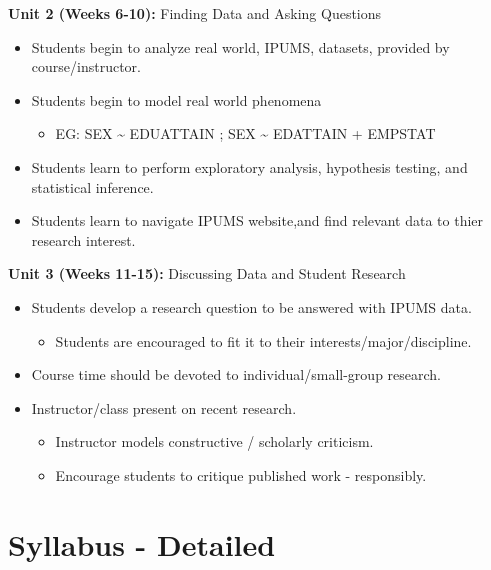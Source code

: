 \documentclass[
]{book}
\providecommand{\tightlist}{%
  \setlength{\itemsep}{0pt}\setlength{\parskip}{0pt}}
\begin{document}
\textbf{Unit 2 (Weeks 6-10):} Finding Data and Asking Questions

\begin{itemize}
\tightlist
\item
  Students begin to analyze real world, IPUMS, datasets, provided by course/instructor.
\item
  Students begin to model real world phenomena

  \begin{itemize}
  \tightlist
  \item
    EG: SEX \textasciitilde{} EDUATTAIN ; SEX \textasciitilde{} EDATTAIN + EMPSTAT
  \end{itemize}
\item
  Students learn to perform exploratory analysis, hypothesis testing, and statistical inference.
\item
  Students learn to navigate IPUMS website,and find relevant data to thier research interest.
\end{itemize}

\textbf{Unit 3 (Weeks 11-15):} Discussing Data and Student Research

\begin{itemize}
\tightlist
\item
  Students develop a research question to be answered with IPUMS data.

  \begin{itemize}
  \tightlist
  \item
    Students are encouraged to fit it to their interests/major/discipline.
  \end{itemize}
\item
  Course time should be devoted to individual/small-group research.
\item
  Instructor/class present on recent research.

  \begin{itemize}
  \tightlist
  \item
    Instructor models constructive / scholarly criticism.
  \item
    Encourage students to critique published work - responsibly.
  \end{itemize}
\end{itemize}

\hypertarget{syllabus---detailed}{%
\section*{Syllabus - Detailed}\label{syllabus---detailed}}
\end{document}
